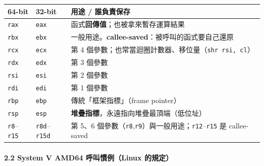 \documentclass[10pt,a4paper]{article}
\newcounter{none}
\begin{document}
{\def\LTcaptype{none} %
\begin{longtable}[]{@{}
  >{\raggedright\arraybackslash}p{}
  >{\raggedright\arraybackslash}p{}
  >{\raggedright\arraybackslash}p{}@{}}
\toprule\noalign{}
\begin{minipage}[b]{\linewidth}\raggedright
64-bit
\end{minipage} & \begin{minipage}[b]{\linewidth}\raggedright
32-bit
\end{minipage} & \begin{minipage}[b]{\linewidth}\raggedright
用途 / 誰負責保存
\end{minipage} \\
\midrule\noalign{}
\endhead
\bottomrule\noalign{}
\endlastfoot
\texttt{rax} & \texttt{eax} &
函式\textbf{回傳值}；也被拿來暫存運算結果 \\
\texttt{rbx} & \texttt{ebx} &
一般用途。\textbf{callee-saved}：被呼叫的函式要自己還原 \\
\texttt{rcx} & \texttt{ecx} & 第 4
個參數；也常當迴圈計數器、移位量（\texttt{shr\ \allowbreak{}rsi,\allowbreak{}\ \allowbreak{}cl}） \\
\texttt{rdx} & \texttt{edx} & 第 3 個參數 \\
\texttt{rsi} & \texttt{esi} & 第 2 個參數 \\
\texttt{rdi} & \texttt{edi} & 第 1 個參數 \\
\texttt{rbp} & \texttt{ebp} & 傳統「框架指標」（frame pointer） \\
\texttt{rsp} & \texttt{esp} &
\textbf{堆疊指標}，永遠指向堆疊最頂端（低位址） \\
\texttt{r8}--\texttt{r15} & \texttt{r8d}--\texttt{r15d} & 第 5、6
個參數（\texttt{r8},\texttt{r9}）與一般用途；\texttt{r12}--\texttt{r15}
是 callee-saved \\
\end{longtable}
}

\paragraph{2.2 System V AMD64 呼叫慣例（Linux
的規定）}\label{system-v-amd64-ux547cux53ebux6163ux4f8blinux-ux7684ux898fux5b9a}
\end{document}
